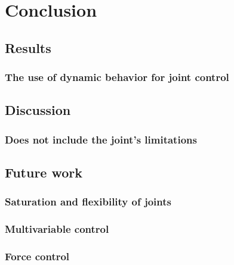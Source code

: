 \chapter{Conclusion}

\section{Results}
\lipsum[1]
\subsection{The use of dynamic behavior for joint control}

\section{Discussion}
\lipsum[1]
\subsection{Does not include the joint's limitations}

\section{Future work}
\lipsum[1]
\subsection{Saturation and flexibility of joints}
\subsection{Multivariable control}
\subsection{Force control}